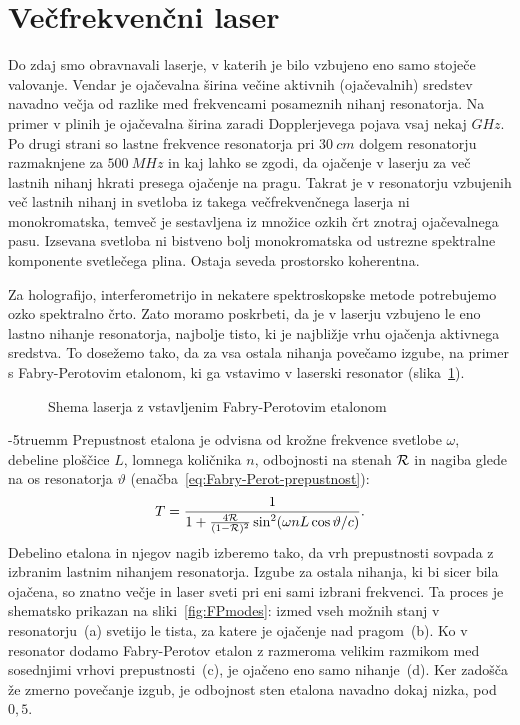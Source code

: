 \section{Večfrekvenčni laser}
\label{section:vecfrek}
Do zdaj smo obravnavali laserje, v katerih je bilo vzbujeno eno samo stoječe
valovanje. Vendar je ojačevalna širina večine aktivnih (ojačevalnih) sredstev 
navadno večja od razlike med frekvencami posameznih 
nihanj resonatorja. Na primer v plinih je ojačevalna širina zaradi 
Dopplerjevega pojava vsaj nekaj $\si{GHz}$. Po drugi strani so lastne frekvence resonatorja 
pri $30~\si{cm}$ dolgem resonatorju razmaknjene za $500~\si{MHz}$ in kaj  
lahko se zgodi, da ojačenje v laserju za več lastnih nihanj hkrati 
presega ojačenje na pragu. Takrat je v resonatorju vzbujenih več lastnih nihanj in 
svetloba iz takega večfrekvenčnega laserja ni monokromatska,
temveč je sestavljena iz množice ozkih črt znotraj ojačevalnega pasu.
Izsevana svetloba ni bistveno bolj monokromatska od ustrezne spektralne 
komponente svetlečega plina. Ostaja seveda prostorsko koherentna.

Za holografijo, interferometrijo in nekatere spektroskopske metode
potrebujemo ozko spektralno črto. Zato moramo poskrbeti, da je v laserju vzbujeno le
eno lastno nihanje resonatorja, najbolje tisto, ki je najbližje vrhu ojačenja
aktivnega sredstva. To dosežemo tako, da za vsa ostala nihanja povečamo izgube,
na primer s Fabry-Perotovim etalonom, 
ki ga vstavimo v laserski resonator
(slika~\ref{fig:FPres}). 
\begin{figure}[ht]
\centering
\def\svgwidth{70truemm} 

\caption{Shema laserja z vstavljenim Fabry-Perotovim etalonom}
\label{fig:FPres}
\end{figure}
\vglue-5truemm
Prepustnost etalona je odvisna od krožne frekvence 
svetlobe $\omega$, debeline ploščice $L$, lomnega količnika $n$, odbojnosti na stenah 
${\cal R}$ in nagiba glede na os resonatorja $\vartheta$ (enačba~\ref{eq:Fabry-Perot-prepustnost}):
\begin{equation}
T=\frac{1}{1+\frac{4{\cal {R}}}{(1-{\cal {R}})^{2}}\sin^{2}
(\omega n L \cos \vartheta/c)}.
\label{5.22}
\end{equation}
Debelino etalona in njegov nagib 
izberemo tako, da vrh prepustnosti sovpada z izbranim lastnim nihanjem resonatorja. 
Izgube za ostala nihanja, ki bi sicer bila ojačena, so znatno večje in laser
sveti pri eni sami izbrani frekvenci. Ta proces je shematsko prikazan na 
sliki~\ref{fig:FPmodes}: izmed vseh možnih stanj v resonatorju~(a) 
svetijo le tista, za katere
je ojačenje nad pragom~(b). 
Ko v resonator dodamo Fabry-Perotov etalon z razmeroma velikim
razmikom med sosednjimi vrhovi prepustnosti~(c), je ojačeno eno samo nihanje~(d). 
Ker zadošča že zmerno povečanje izgub, je odbojnost sten etalona navadno dokaj nizka, 
pod $0,5$. 

